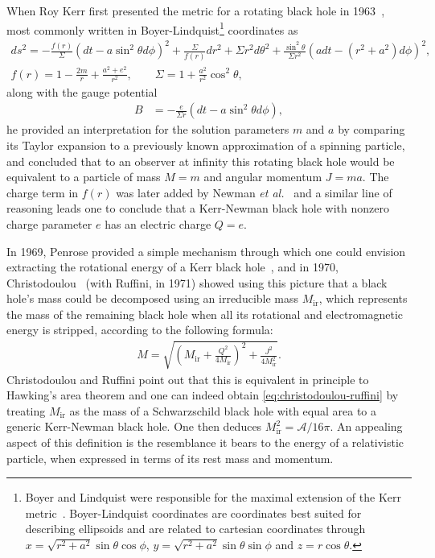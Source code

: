 \documentclass[
twoside,
openright,
frontopenright
]{dmathesis}
\newcommand{\nn}{\nonumber}
\begin{document}
When Roy Kerr first presented the metric for a rotating black hole in
1963~\cite{Kerr:1963ud}, most commonly written in Boyer-Lindquist\footnote{Boyer
  and Lindquist were responsible for the maximal extension of the Kerr
  metric~\cite{Boyer:1966qh}. Boyer-Lindquist coordinates are coordinates best
  suited for describing ellipsoids and are related to cartesian coordinates
  through $ x = \sqrt{r^2+a^2}\sin\theta\cos\phi$,
  $y = \sqrt{r^2 + a^2}\sin\theta \sin \phi$ and $z=r\cos\theta$.} coordinates
as
\begin{gather}
  ds^2 = -\frac{f(r)}{\Sigma}(dt - a \sin^2 \theta d\phi)^2 +
  \frac{\Sigma}{f(r)}dr^2 + \Sigma r^2 d\theta^2 + \frac{\sin^2\theta}{\Sigma
  r^2}(adt - (r^2+a^2)d\phi)^2,\nn\\
  f(r) = 1- \frac{2m}{r} + \frac{a^2+e^2}{r^2}, \qquad \Sigma = 1+\frac{a^2}{r^2}\cos^2\theta,
  \label{eq:kerrAF}
\end{gather}
along with the gauge potential
\begin{align}
  B&=-\frac{e}{\Sigma r}(dt-a\sin^2\theta d\phi),
\end{align}
he provided an interpretation for the solution parameters $m$ and $a$ by
comparing its Taylor expansion to a previously known approximation of a spinning
particle, and concluded that to an observer at infinity this rotating black hole
would be equivalent to a particle of mass $M=m$ and angular momentum $J=ma$. The
charge term in $f(r)$ was later added by Newman \emph{et
  al.}~\cite{Newman:1965my} and a similar line of reasoning leads one to
conclude that a Kerr-Newman black hole with nonzero charge parameter $e$ has an
electric charge $Q = e$.

In 1969, Penrose provided a simple mechanism through which one could envision
extracting the rotational energy of a Kerr black hole~\cite{Penrose:1969pc}, and
in 1970, Christodoulou~\cite{Christodoulou:1970wf,Christodoulou:1972kt} (with
Ruffini, in 1971) showed using this picture that a black hole's mass could be
decomposed using an irreducible mass $M_\mathrm{ir}$, which represents the mass
of the remaining black hole when all its rotational and electromagnetic energy
is stripped, according to the following formula:
\begin{align}
  \label{eq:christodoulou-ruffini}
  M=\sqrt{\left(M_\mathrm{ir}+\frac{Q^2}{4M_\mathrm{ir}}\right)^2 + \frac{J^2}{4M_\mathrm{ir}^2}}.
\end{align}
Christodoulou and Ruffini point out that this is equivalent in principle to
Hawking's area theorem and one can indeed obtain \cref{eq:christodoulou-ruffini}
by treating $M_\mathrm{ir}$ as the mass of a Schwarzschild black hole with equal
area to a generic Kerr-Newman black hole. One then deduces
$M_\mathrm{ir}^2 = \mathcal{A}/16\pi$. An appealing aspect of this definition is
the resemblance it bears to the energy of a relativistic particle, when
expressed in terms of its rest mass and momentum.
\end{document}
